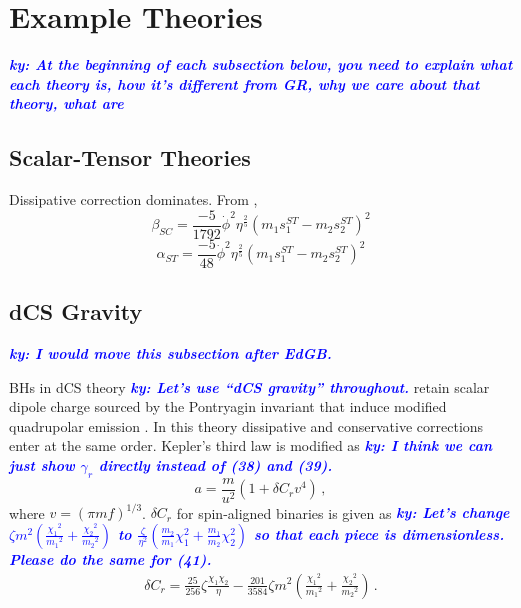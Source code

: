 \documentclass[prd,twocolumn,nofootinbib]{revtex4-1}
\newcommand{\ky}[1]{\textcolor{blue}{\it{\textbf{ky: #1}}} }
\begin{document}
 \section{Example Theories}
 \vspace*{20pt}

\ky{At the beginning of each subsection below, you need to explain what each theory is, how it's different from GR, why we care about that theory, what are }

 \subsection{Scalar-Tensor Theories}
 Dissipative correction dominates.  From \cite{Yunes:2016jcc},
 \begin{equation}
 \beta_{SC}=\frac{-5}{1792}\dot{\phi}^2\eta^{\frac{2}{5}}(m_1s_1^{ST}-m_2s_2^{ST})^2
 \end{equation}
 \begin{equation}
 \alpha_{ST}=\frac{-5}{48}\dot{\phi}^2\eta^{\frac{2}{5}}(m_1s_1^{ST}-m_2s_2^{ST})^2
 \end{equation}
 
 \subsection{dCS Gravity}
 
 \ky{I would move this subsection after EdGB.}
 
\hspace{15.5pt}BHs in dCS theory \ky{Let's use ``dCS gravity'' throughout.} retain scalar dipole charge sourced by the Pontryagin invariant that induce modified quadrupolar emission \cite{Yagi:2011xp,Yunes:2016jcc}. In this theory dissipative and conservative corrections enter at the same order. Kepler's third law is modified as \cite{Yagi:2012vf} \ky{I think we can just show $\gamma_r$ directly instead of (38) and (39).}
 \begin{equation}\label{eq:3.3a}
 a=\frac{m}{u^2}(1+\delta C_r v^4)\,,
 \end{equation}
where $v=(\pi m f)^{1/3}$. $\delta C_r$ for  spin-aligned binaries is given as  \ky{Let's change $\zeta m^2 \left(\frac{{\chi_1}^2}{{m_1}^2}+\frac{{\chi_2}^2}{{m_2}^2}\right)$ to $\frac{\zeta}{\eta^2}\left(\frac{m_2}{m_1}\chi_1^2+\frac{m_1}{m_2}\chi_2^2\right)$ so that each piece is dimensionless. Please do the same for (41).}
\begin{align}
\delta C_r=\frac{25}{256}\zeta \frac{\chi_1 \chi_2}{\eta}-\frac{201}{3584}\zeta m^2\left(\frac{{\chi_1}^2}{{m_1}^2}+\frac{{\chi_2}^2}{{m_2}^2}\right)\,.
\end{align} 
\end{document}
